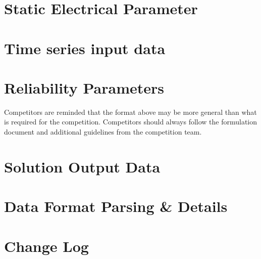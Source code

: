 \documentclass{article}
\begin{document}
\section{Static Electrical Parameter}
\label{sec:format_spec}



\section{Time series input data}


\section{Reliability Parameters}


Competitors are reminded that the format above may be more general than
what is required for the competition.
Competitors should always
follow the formulation document and additional guidelines from the competition team.





\section{Solution Output Data}


\section{Data Format Parsing \& Details}


\section{Change Log}
\end{document}
